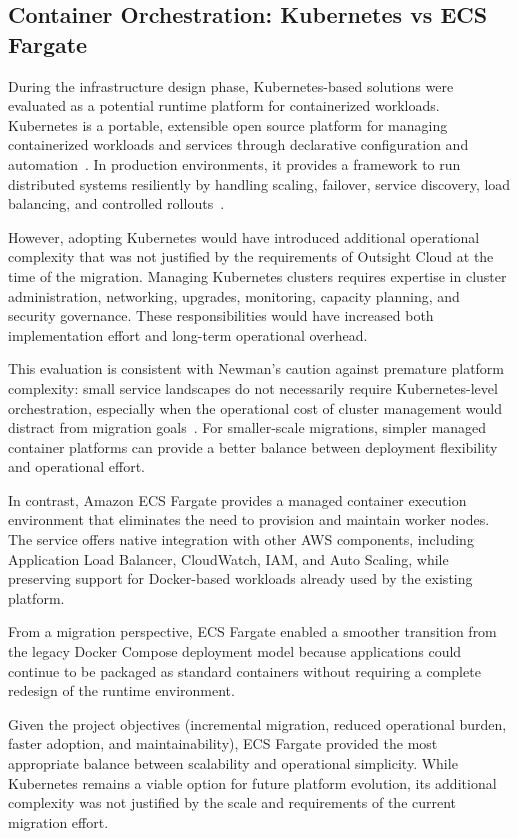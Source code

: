 \subsection{Container Orchestration: Kubernetes vs ECS Fargate}
\label{sec:k8s-ecs-comparison}
During the infrastructure design phase, Kubernetes-based solutions were evaluated as a potential runtime platform for containerized workloads. Kubernetes is a portable, extensible open source platform for managing containerized workloads and services through declarative configuration and automation~\cite{kubernetesOverview}. In production environments, it provides a framework to run distributed systems resiliently by handling scaling, failover, service discovery, load balancing, and controlled rollouts~\cite{kubernetesOverview}.

However, adopting Kubernetes would have introduced additional operational complexity that was not justified by the requirements of Outsight Cloud at the time of the migration. Managing Kubernetes clusters requires expertise in cluster administration, networking, upgrades, monitoring, capacity planning, and security governance. These responsibilities would have increased both implementation effort and long-term operational overhead.

This evaluation is consistent with Newman's caution against premature platform complexity: small service landscapes do not necessarily require Kubernetes-level orchestration, especially when the operational cost of cluster management would distract from migration goals~\cite{newman2021building}. For smaller-scale migrations, simpler managed container platforms can provide a better balance between deployment flexibility and operational effort.

In contrast, Amazon ECS Fargate provides a managed container execution environment that eliminates the need to provision and maintain worker nodes. The service offers native integration with other AWS components, including Application Load Balancer, CloudWatch, IAM, and Auto Scaling, while preserving support for Docker-based workloads already used by the existing platform.

From a migration perspective, ECS Fargate enabled a smoother transition from the legacy Docker Compose deployment model because applications could continue to be packaged as standard containers without requiring a complete redesign of the runtime environment.

Given the project objectives (incremental migration, reduced operational burden, faster adoption, and maintainability), ECS Fargate provided the most appropriate balance between scalability and operational simplicity. While Kubernetes remains a viable option for future platform evolution, its additional complexity was not justified by the scale and requirements of the current migration effort.

